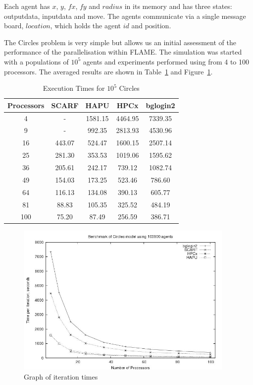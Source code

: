 Each agent has $x$, $y$, $fx$, $fy$ and $radius$ in its memory and has three states: outputdata, inputdata and move. The agents communicate via a single message board, $location$, which holds the agent $id$ and position.

The Circles problem is very simple but allows us an initial assessment of the performance of the parallelisation within FLAME. The simulation was started with a populations of $10^5$  agents and experiments performed using from 4 to 100 processors. The averaged results are shown in Table~\ref{tab:ExecutionTimesForCircles} and Figure~\ref{fig:Circles-graph}.

{
\renewcommand{\arraystretch}{1.25}
\begin{table}[ht]
 \centering
  \begin{tabular}{c|cccc}
 Processors &SCARF  &HAPU  &HPCx  &bglogin2 \\ \hline
4 &- &1581.15 &4464.95 &7339.35 \\
9 &- &992.35 &2813.93 &4530.96  \\
16 &443.07 &524.47 &1600.15 &2507.14    \\
25 &281.30 &353.53 &1019.06 &1595.62    \\
36 &205.61 &242.17 &739.12 &1082.74     \\
49 &154.03 &173.25 &523.46 &786.60      \\
64 &116.13 &134.08 &390.13 &605.77      \\
81 &88.83 &105.35 &325.52 &484.19       \\
100 &75.20 &87.49 &256.59 &386.71       \\
 \end{tabular}
 \caption{Execution Times for $10^5$ Circles}
 \label{tab:ExecutionTimesForCircles}
\end{table}
}

\begin{figure}[ht]
 \centering
  \includegraphics[width=300pt]{Circles-graph.jpg}
 \caption{Graph of iteration times}
 \label{fig:Circles-graph}
\end{figure}

